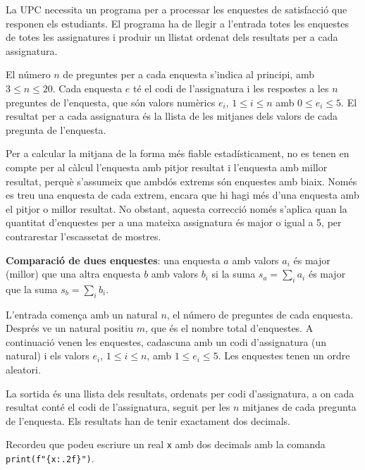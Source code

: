

\Statement

La UPC necessita un programa per a processar les enquestes de satisfacció que responen els estudiants. El programa ha de llegir a l'entrada totes les enquestes de totes les assignatures i produir un llistat ordenat dels resultats per a cada assignatura.

\medskip

El número $n$ de preguntes per a cada enquesta s'indica al principi, amb $3\leq n\leq 20$. Cada enquesta $e$ té el codi de l'assignatura i les respostes a les $n$ preguntes de l'enquesta, que són valors numèrics $e_i$, $1 \leq i \leq n$ amb $0 \leq e_i \leq 5$. El resultat per a cada assignatura és la llista de les mitjanes dels valors de cada pregunta de l'enquesta.

\medskip

Per a calcular la mitjana de la forma més fiable estadísticament, no es tenen en compte per al càlcul l'enquesta amb pitjor resultat i l'enquesta amb millor resultat, perquè s'assumeix que ambdós extrems són enquestes amb biaix. Només es treu una enquesta de cada extrem, encara que hi hagi més d'una enquesta amb el pitjor o millor resultat. No obstant, aquesta correcció només s'aplica quan la quantitat d'enquestes per a una mateixa assignatura és major o igual a 5, per contrarestar l'escassetat de mostres.

\medskip

\textbf{Comparació de dues enquestes}: una enquesta $a$ amb valors $a_i$ és major (millor) que una altra enquesta $b$ amb valors $b_i$ si la suma $s_a = \sum_{i} a_i$ és major que la suma $s_b = \sum_i b_i$.

\Input

L'entrada comença amb un natural $n$, el número de preguntes de cada enquesta. Després ve un natural positiu $m$, que és el nombre total d'enquestes. A continuació venen les enquestes, cadascuna amb un codi d'assignatura (un natural) i els valors $e_i$, $1 \leq i \leq n$, amb $1 \leq e_i \leq 5$. Les enquestes tenen un ordre aleatori.

\Output

La sortida és una llista dels resultats, ordenats per codi d'assignatura, a on cada resultat conté el codi de l'assignatura, seguit per les $n$ mitjanes de cada pregunta de l'enquesta. Els resultats han de tenir exactament dos decimals.

\Observation

Recordeu que podeu escriure un real \texttt{x} amb dos decimals amb la comanda \texttt{print(f"\{x:.2f\}")}.


\Sample
